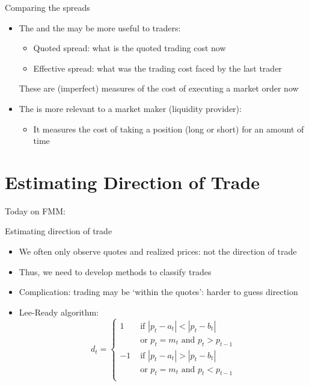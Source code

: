 \begin{frame}{Comparing the spreads}
	\begin{itemize}
		\item The  and the  may be more useful to traders:
		\begin{itemize}
			\item Quoted spread: what is the quoted trading cost now 
			\item Effective spread: what was the trading cost faced by the last trader
		\end{itemize}
		These are (imperfect) measures of the cost of executing a market order now
		\item The  is more relevant to a market maker (liquidity provider):
		\begin{itemize}
			\item It measures the cost of taking a position (long or short) for an amount of time
		\end{itemize}
	\end{itemize}
\end{frame}



\section{Estimating Direction of Trade}

\begin{frame}{Today on FMM:}
\tableofcontents[currentsection]
\end{frame}


\begin{frame}{Estimating direction of trade}
	\begin{itemize}
		\item We often only observe quotes and realized prices: not the direction of trade
		\item Thus, we need to develop methods to classify trades
		\item Complication: trading may be `within the quotes': harder to guess direction
		\item \alert{Lee-Ready algorithm}:
		\[
		d_t = \left\{
		\begin{aligned}
		1 & \text{ if } |p_t-a_t| < |p_t-b_t| \\
		&\text{ or } p_t=m_t \text{ and } p_t>p_{t-1}\\
		-1 & \text{ if } |p_t-a_t| > |p_t-b_t| \\
		& \text{ or } p_t=m_t \text{ and } p_t<p_{t-1} \\
		\end{aligned}
		\right.
		\]
	\end{itemize}
\end{frame}


